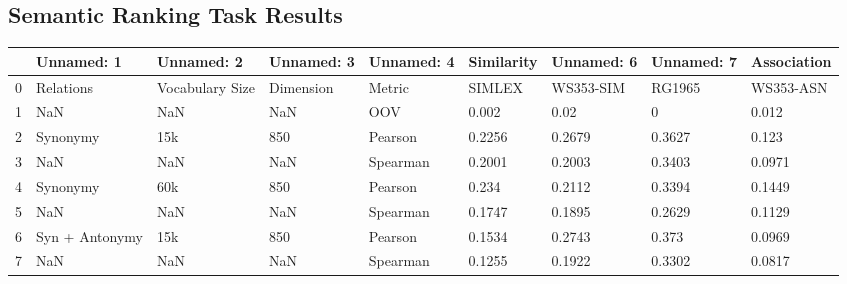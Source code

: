 \label{appsubsec:projectorvisu}
\subsection{Semantic Ranking Task Results}
\label{appsubsec:wnembeddingtests}
\begin{table}
\begin{tabularx}{\textwidth}{*{9}{X}}
    \toprule
    {} &                                         Unnamed: 1 &                                   Unnamed: 2 & Unnamed: 3 & Unnamed: 4 & Similarity & Unnamed: 6 & Unnamed: 7 & Association \\
    \midrule
    0  &                                          Relations &                              Vocabulary Size &  Dimension &     Metric &     SIMLEX &  WS353-SIM &     RG1965 &   WS353-ASN \\
    1  &                                                NaN &                                          NaN &        NaN &        OOV &      0.002 &       0.02 &          0 &       0.012 \\
    2  &                                           Synonymy &                                          15k &        850 &    Pearson &     0.2256 &     0.2679 &     0.3627 &       0.123 \\
    3  &                                                NaN &                                          NaN &        NaN &   Spearman &     0.2001 &     0.2003 &     0.3403 &      0.0971 \\
    4  &                                           Synonymy &                                          60k &        850 &    Pearson &      0.234 &     0.2112 &     0.3394 &      0.1449 \\
    5  &                                                NaN &                                          NaN &        NaN &   Spearman &     0.1747 &     0.1895 &     0.2629 &      0.1129 \\
    6  &                                     Syn + Antonymy &                                          15k &        850 &    Pearson &     0.1534 &     0.2743 &      0.373 &      0.0969 \\
    7  &                                                NaN &                                          NaN &        NaN &   Spearman &     0.1255 &     0.1922 &     0.3302 &      0.0817 \\

\end{tabularx}
\end{table}
